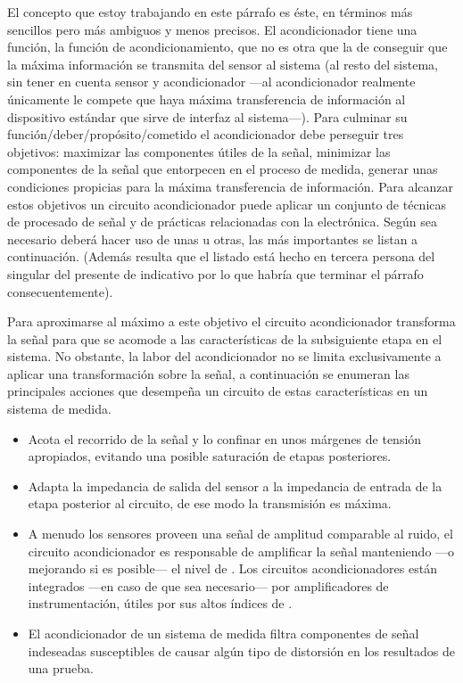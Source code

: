 El concepto que estoy trabajando en este párrafo es éste, en términos más
sencillos pero más ambiguos y menos precisos. El acondicionador tiene una
función, la función de acondicionamiento, que no es otra que la de
conseguir que la máxima información se transmita del sensor al sistema (al
resto del sistema, sin tener en cuenta sensor y acondicionador —al
acondicionador realmente únicamente le compete que haya máxima
transferencia de información al dispositivo estándar que sirve de interfaz
al sistema—). Para culminar su función/deber/propósito/cometido el
acondicionador debe perseguir tres objetivos: maximizar las componentes
útiles de la señal, minimizar las componentes de la señal que entorpecen
en el proceso de medida, generar unas condiciones propicias para la máxima
transferencia de información. Para alcanzar estos objetivos un circuito
acondicionador puede aplicar un conjunto de técnicas de procesado de señal
y de prácticas relacionadas con la electrónica. Según sea necesario deberá
hacer uso de unas u otras, las más importantes se listan a continuación.
(Además resulta que el listado está hecho en tercera persona del singular
del presente de indicativo por lo que habría que terminar el párrafo
consecuentemente).

Para aproximarse al máximo a este objetivo el circuito acondicionador
transforma la señal para que se acomode a las características de la
subsiguiente etapa en el sistema. No obstante, la labor del acondicionador
no se limita exclusivamente a aplicar una transformación sobre la señal, a
continuación se enumeran las principales acciones que desempeña un circuito
de estas características en un sistema de medida.

\begin{itemize}
	\item Acota el recorrido de la señal y lo confinar en unos márgenes
		de tensión apropiados, evitando una posible saturación de
		etapas posteriores.
	\item Adapta la impedancia de salida del sensor a la impedancia de
		entrada de la etapa posterior al circuito, de ese modo la
		transmisión es máxima.
	\item A menudo los sensores proveen una señal de amplitud
		comparable al ruido, el circuito acondicionador es
		responsable de amplificar la señal manteniendo ---o
		mejorando si es posible--- el nivel de . Los
		circuitos acondicionadores están integrados ---en caso de
		que sea necesario--- por amplificadores de instrumentación,
		útiles por sus altos índices de .
	\item El acondicionador de un sistema de medida filtra componentes
		de señal indeseadas susceptibles de causar algún tipo de
		distorsión en los resultados de una prueba.
\end{itemize}


